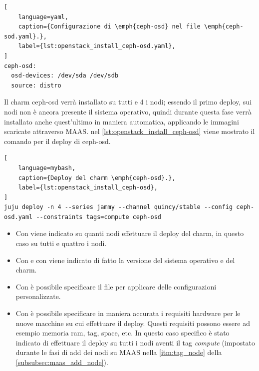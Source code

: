 \begin{lstlisting}[
    language=yaml, 
    caption={Configurazione di \emph{ceph-osd} nel file \emph{ceph-sod.yaml}.}, 
    label={lst:openstack_install_ceph-osd.yaml},
]
ceph-osd:
  osd-devices: /dev/sda /dev/sdb
  source: distro
\end{lstlisting}

\bigskip\noindent
Il charm ceph-osd verrà installato su tutti e 4 i nodi;
% 
essendo il primo deploy, sui nodi non è ancora presente il sistema operativo, quindi durante questa fase verrà installato anche quest'ultimo in maniera automatica, applicando le immagini scaricate attraverso MAAS.
% 
nel \cref{lst:openstack_install_ceph-osd} viene mostrato il comando per il deploy di ceph-osd.
\begin{lstlisting}[
    language=mybash, 
    caption={Deploy del charm \emph{ceph-osd}.}, 
    label={lst:openstack_install_ceph-osd},
]
juju deploy -n 4 --series jammy --channel quincy/stable --config ceph-osd.yaml --constraints tags=compute ceph-osd
\end{lstlisting}
\begin{itemize}
    \item Con  viene indicato su quanti nodi effettuare il deploy del charm, in questo caso su tutti e quattro i nodi.
    
    \item Con  e con  viene indicato di fatto la versione del sistema operativo e del charm.

    \item Con  è possibile specificare il file  per applicare delle configurazioni personalizzate.

    \item  Con  è possibile specificare in maniera accurata i requisiti  hardware per le nuove macchine su cui effettuare il deploy.
    Questi requisiti possono essere ad esempio memoria ram, tag, space, etc.
    In questo caso specifico è stato indicato di effettuare il deploy su tutti i nodi aventi il tag \emph{compute} (impostato durante le fasi di add dei nodi su MAAS nella \cref{itm:tag_node} della \cref{subsubsec:maas_add_node}).
\end{itemize}



